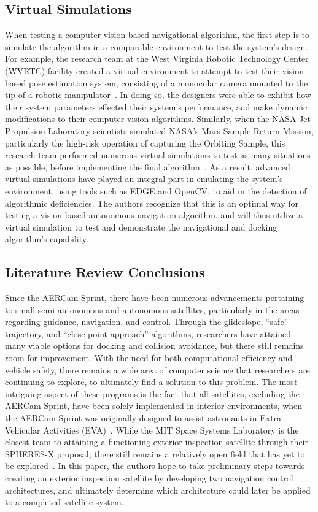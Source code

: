 \documentclass[journal, 10pt]{IEEEtran}
\begin{document}
\subsection{Virtual Simulations}
When testing a computer-vision based navigational algorithm, the first step is to simulate the algorithm in a comparable environment to test the system's design. For example, the research team at the West Virginia Robotic Technology Center (WVRTC) facility created a virtual environment to attempt to test their vision based pose estimation system, consisting of a monocular camera mounted to the tip of a robotic manipulator~\cite{virt_sim}. In doing so, the designers were able to exhibit how their system parameters effected their system's performance, and make dynamic modifications to their computer vision algorithms. Similarly, when the NASA Jet Propulsion Laboratory scientists simulated NASA's Mars Sample Return Mission, particularly the high-risk operation of capturing the Orbiting Sample, this research team performed numerous virtual simulations to test as many situations as possible, before implementing the final algorithm~\cite{mars}. As a result, advanced virtual simulations have played an integral part in emulating the system's environment, using tools such as EDGE and OpenCV, to aid in the detection of algorithmic deficiencies. The authors recognize that this is an optimal way for testing a vision-based autonomous navigation algorithm, and will thus utilize a virtual simulation to test and demonstrate the navigational and docking algorithm's capability.

\subsection{Literature Review Conclusions}
Since the AERCam Sprint, there have been numerous advancements pertaining to small semi-autonomous and autonomous satellites, particularly in the areas regarding guidance, navigation, and control. Through the glideslope, ``safe'' trajectory, and ``close point approach'' algorithms, researchers have attained many viable options for docking and collision avoidance, but there still remains room for improvement. With the need for both computational efficiency and vehicle safety, there remains a wide area of computer science that researchers are continuing to explore, to ultimately find a solution to this problem. The most intriguing aspect of these programs is the fact that all satellites, excluding the AERCam Sprint, have been solely implemented in interior environments, when the AERCam Sprint was originally designed to assist astronauts in Extra Vehicular Activities (EVA)~\cite{Aercam, MiniAercam}. While the MIT Space Systems Laboratory is the closest team to attaining a functioning exterior inspection satellite through their SPHERES-X proposal, there still remains a relatively open field that has yet to be explored~\cite{SPHERES}. In this paper, the authors hope to take preliminary steps towards creating an exterior inspection satellite by developing two navigation control architectures, and ultimately determine which architecture could later be applied to a completed satellite system.
\end{document}
